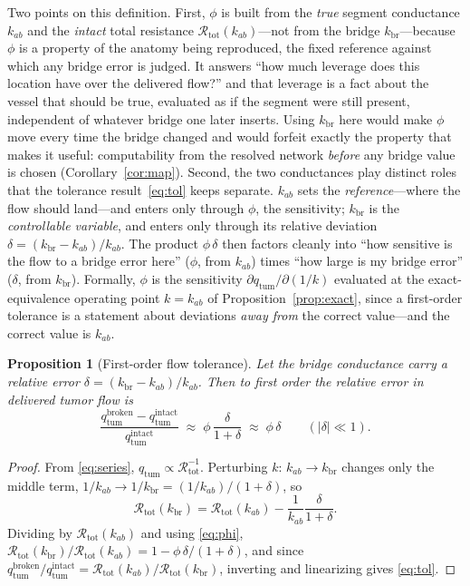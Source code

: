 \documentclass[11pt]{article}
\newtheorem{proposition}{Proposition}
\newcommand{\Rtot}{\mathcal{R}_{\mathrm{tot}}}
\newcommand{\kbr}{k_{\mathrm{br}}}
\newcommand{\qtum}{q_{\mathrm{tum}}}
\begin{document}
\noindent
Two points on this definition. First, $\phi$ is built from the \emph{true} segment
conductance $k_{ab}$ and the \emph{intact} total resistance $\Rtot(k_{ab})$---not
from the bridge $\kbr$---because $\phi$ is a property of the anatomy being
reproduced, the fixed reference against which any bridge error is judged. It answers
``how much leverage does this location have over the delivered flow?'' and that
leverage is a fact about the vessel that should be true, evaluated as if the segment
were still present, independent of whatever bridge one later inserts. Using $\kbr$
here would make $\phi$ move every time the bridge changed and would forfeit exactly
the property that makes it useful: computability from the resolved network
\emph{before} any bridge value is chosen (Corollary~\ref{cor:map}).
Second, the two conductances play distinct roles that the tolerance
result~\eqref{eq:tol} keeps separate. $k_{ab}$ sets the \emph{reference}---where the
flow should land---and enters only through $\phi$, the sensitivity; $\kbr$ is the
\emph{controllable variable}, and enters only through its relative deviation
$\delta=(\kbr-k_{ab})/k_{ab}$. The product $\phi\,\delta$ then factors cleanly into
``how sensitive is the flow to a bridge error here'' ($\phi$, from $k_{ab}$) times
``how large is my bridge error'' ($\delta$, from $\kbr$). Formally, $\phi$ is the
sensitivity $\partial q_{\mathrm{tum}}/\partial(1/k)$ evaluated at the
exact-equivalence operating point $k=k_{ab}$ of Proposition~\ref{prop:exact}, since a
first-order tolerance is a statement about deviations \emph{away from} the correct
value---and the correct value is $k_{ab}$.

\begin{proposition}[First-order flow tolerance]
\label{prop:tol}
Let the bridge conductance carry a relative error $\delta = (\kbr - k_{ab})/k_{ab}$.
Then to first order the relative error in delivered tumor flow is
\begin{equation}
\frac{\qtum^{\mathrm{broken}} - \qtum^{\mathrm{intact}}}{\qtum^{\mathrm{intact}}}
\;\approx\; \phi\,\frac{\delta}{1+\delta}
\;\approx\; \phi\,\delta
\qquad (|\delta|\ll 1).
\label{eq:tol}
\end{equation}
\end{proposition}

\begin{proof}
From \eqref{eq:series}, $\qtum \propto \Rtot^{-1}$. Perturbing $k\!:\,k_{ab}\to\kbr$
changes only the middle term, $1/k_{ab}\to 1/\kbr = (1/k_{ab})/(1+\delta)$, so
\[
\Rtot(\kbr) = \Rtot(k_{ab}) - \frac{1}{k_{ab}}\frac{\delta}{1+\delta}.
\]
Dividing by $\Rtot(k_{ab})$ and using \eqref{eq:phi},
$\Rtot(\kbr)/\Rtot(k_{ab}) = 1 - \phi\,\delta/(1+\delta)$, and since
$\qtum^{\mathrm{broken}}/\qtum^{\mathrm{intact}} = \Rtot(k_{ab})/\Rtot(\kbr)$,
inverting and linearizing gives \eqref{eq:tol}.
\end{proof}
\end{document}
